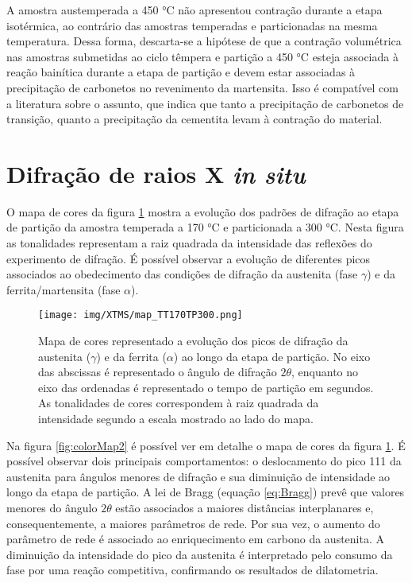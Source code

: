 A amostra austemperada a 450 °C não apresentou contração durante a etapa isotérmica, ao contrário das amostras temperadas e particionadas na mesma temperatura. Dessa forma, descarta-se a hipótese de que a contração volumétrica nas amostras submetidas ao ciclo têmpera e partição a 450 °C esteja associada à reação bainítica durante a etapa de partição e devem estar associadas à precipitação de carbonetos no revenimento da martensita. Isso é compatível com a literatura sobre o assunto, que indica que tanto a precipitação de carbonetos de transição, quanto a precipitação da cementita levam à contração do material\cite{Morra2001}.

\section{Difra\c{c}\~{a}o de raios X \textit{in situ}}

\label{sec:DRXInSitu}

O mapa de cores da figura \ref{fig:colorMap} mostra a evolução dos padrões de difração ao etapa de partição da amostra temperada a 170 °C e particionada a 300 °C. Nesta figura as tonalidades representam a raiz quadrada da intensidade das reflexões do experimento de difração. É possível observar a evolução de diferentes picos associados ao obedecimento das condições de difração da austenita (fase $\gamma$) e da ferrita/martensita (fase $\alpha$).

\begin{figure}
	\texttt{[image: img/XTMS/map\_TT170TP300.png]}
	\caption{Mapa de cores representado a evolução dos picos de difração da austenita ($\gamma$) e da ferrita ($\alpha$) ao longo da etapa de partição. No eixo das abscissas é representado o ângulo de difração $2\theta$, enquanto no eixo das ordenadas é representado o tempo de partição em segundos. As tonalidades de cores correspondem à raiz quadrada da intensidade segundo a escala mostrado ao lado do mapa.}
	\label{fig:colorMap}
\end{figure}

Na figura \ref{fig:colorMap2} é possível ver em detalhe o mapa de cores da figura \ref{fig:colorMap}. É possível observar dois principais comportamentos: o deslocamento do pico {111} da austenita para ângulos menores de difração e sua diminuição de intensidade ao longo da etapa de partição. A lei de Bragg (equação \ref{eq:Bragg}) prevê que valores menores do ângulo $2\theta$ estão associados a maiores distâncias interplanares e, consequentemente, a maiores parâmetros de rede. Por sua vez, o aumento do parâmetro de rede é associado ao enriquecimento em carbono da austenita. A diminuição da intensidade do pico da austenita é interpretado pelo consumo da fase por uma reação competitiva, confirmando os resultados de dilatometria.

